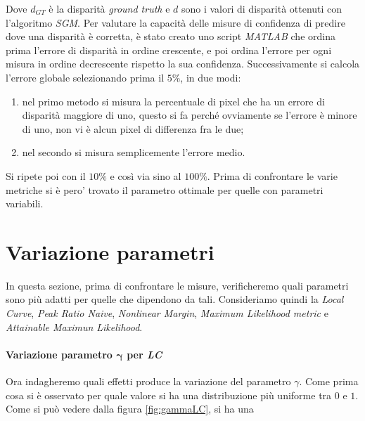 \documentclass[12pt]{report}
\begin{document}
		\noindent Dove $d_{GT}$ è la disparità \textit{ground truth} e $d$ sono i valori di disparità ottenuti con l'algoritmo \textit{SGM}. \newline Per valutare la capacità delle misure di confidenza di predire dove una disparità è corretta, è stato creato uno script \textit{MATLAB} che ordina prima l'errore di disparità in ordine crescente, e poi ordina l'errore per ogni misura in ordine decrescente rispetto la sua confidenza. Successivamente si calcola l'errore globale selezionando prima il $5\%$, in due modi: 
		
		\begin{enumerate}
			\item nel primo metodo si misura la percentuale di pixel che ha un errore di disparità maggiore di uno, questo si fa perché ovviamente se l'errore è minore di uno, non vi è alcun pixel di differenza fra le due;
			
			\item nel secondo si misura semplicemente l'errore medio.
			\label{enum:errore}
		\end{enumerate}
				
		\noindent Si ripete poi con il $10\%$ e così via sino al $100\%$. Prima di confrontare le varie metriche si è pero' trovato il parametro ottimale per quelle con parametri variabili.
		
		\section{Variazione parametri}
		\label{sec:parametri}
		
			In questa sezione, prima di confrontare le misure, verificheremo quali parametri sono più adatti per quelle che dipendono da tali. Consideriamo quindi la \textit{Local Curve}, \textit{Peak Ratio Naive}, \textit{Nonlinear Margin}, \textit{Maximum Likelihood metric} e \textit{Attainable Maximun Likelihood}.
		
			\paragraph{Variazione parametro $\bm{\gamma}$ per \textit{LC}}
			\label{par:gamma}
			
				Ora indagheremo quali effetti produce la variazione del parametro $\gamma$. Come prima cosa si è osservato per quale valore si ha una distribuzione più uniforme tra $0$ e $1$. Come si può vedere dalla figura \ref{fig:gammaLC}, si ha una
		
\end{document}
